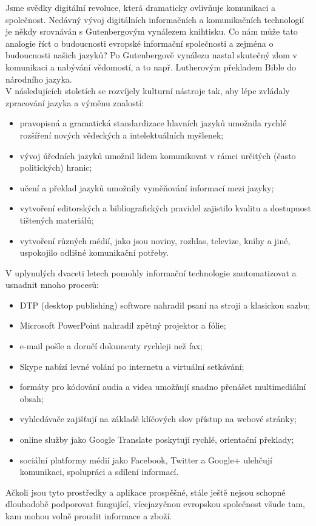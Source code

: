 \documentclass[]{../../metanetpaper}
\begin{document}
\begin{multicols}{2}

Jsme svědky digitální revoluce, která dramaticky ovlivňuje komunikaci a společnost. Nedávný vývoj digitálních informačních a komunikačních technologií je někdy srovnáván s Gutenbergovým vynálezem knihtisku. Co nám může tato analogie říct o budoucnosti evropské informační společnosti a zejména o budoucnosti našich jazyků?
Po Gutenbergově vynálezu nastal skutečný zlom v komunikaci a nabývání vědomostí, a to např. Lutherovým překladem Bible do národního jazyka.\\ V následujících stoletích se rozvíjely kulturní nástroje tak, aby lépe zvládaly zpracování jazyka a výměnu znalostí:
    
    \begin{itemize}
      \item pravopisná a gramatická standardizace hlavních jazyků umožnila rychlé rozšíření nových vědeckých a intelektuálních myšlenek;
      \item vývoj úředních jazyků umožnil lidem komunikovat v rámci určitých (často politických) hranic;
      \item učení a překlad jazyků umožnily vyměňování informací mezi jazyky;
      \item vytvoření editorských a bibliografických pravidel zajistilo kvalitu a dostupnost tištených materiálů;
      \item vytvoření různých médií, jako jsou noviny, rozhlas, televize, knihy a jiné, uspokojilo odlišné komunikační potřeby.
    \end{itemize}
    
V uplynulých dvaceti letech pomohly informační technologie zautomatizovat a usnadnit mnoho procesů:\\

    \begin{itemize}
      \item DTP (desktop publishing) software nahradil psaní na stroji a klasickou sazbu;
      \item Microsoft PowerPoint nahradil zpětný projektor a fólie;
      \item e-mail pošle a doručí dokumenty rychleji než fax;
      \item Skype nabízí levné volání po internetu a virtuální setkávání;
      \item formáty pro kódování audia a videa umožňují snadno přenášet multimediální obsah;
      \item vyhledávače zajišťují na základě klíčových slov přístup na webové stránky;
      \item online služby jako Google Translate poskytují rychlé, orientační překlady;
      \item sociální platformy médií jako Facebook, Twitter a Google+ ulehčují komunikaci, spolupráci a sdílení informací.
    \end{itemize}
Ačkoli jsou tyto prostředky a aplikace prospěšné, stále ještě nejsou schopné dlouhodobě podporovat fungující, vícejazyčnou evropskou společnost všude tam, kam mohou volně proudit informace a zboží.
\pagebreak

\end{multicols}
\end{document}
